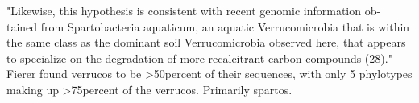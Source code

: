 "Likewise, this hypothesis is consistent with recent genomic information ob- tained from Spartobacteria aquaticum, an aquatic Verrucomicrobia that is within the same class as the dominant soil Verrucomicrobia observed here, that appears to specialize on the degradation of more recalcitrant carbon compounds (28)."  Fierer found verrucos to be >50percent of their sequences, with only 5 phylotypes making up >75percent of the verrucos.  Primarily spartos.  \cite{Fierer_2013} 